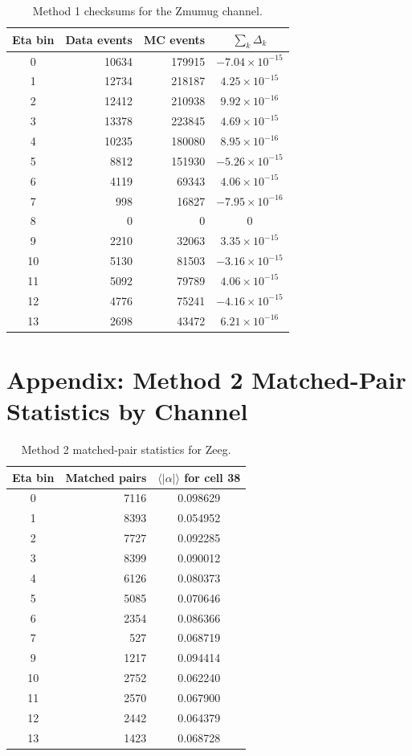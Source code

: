\documentclass[11pt,a4paper]{article}
\begin{document}
\begin{table}[H]
\centering
\caption{Method 1 checksums for the Zmumug channel.}
\begin{tabular}{crrc}
\toprule
Eta bin & Data events & MC events & $\sum_k \Delta_k$ \\
\midrule
0 & 10634 & 179915 & $-7.04 \times 10^{-15}$ \\
1 & 12734 & 218187 & $4.25 \times 10^{-15}$ \\
2 & 12412 & 210938 & $9.92 \times 10^{-16}$ \\
3 & 13378 & 223845 & $4.69 \times 10^{-15}$ \\
4 & 10235 & 180080 & $8.95 \times 10^{-16}$ \\
5 & 8812 & 151930 & $-5.26 \times 10^{-15}$ \\
6 & 4119 & 69343 & $4.06 \times 10^{-15}$ \\
7 & 998 & 16827 & $-7.95 \times 10^{-16}$ \\
8 & 0 & 0 & 0 \\
9 & 2210 & 32063 & $3.35 \times 10^{-15}$ \\
10 & 5130 & 81503 & $-3.16 \times 10^{-15}$ \\
11 & 5092 & 79789 & $4.06 \times 10^{-15}$ \\
12 & 4776 & 75241 & $-4.16 \times 10^{-15}$ \\
13 & 2698 & 43472 & $6.21 \times 10^{-16}$ \\
\bottomrule
\end{tabular}
\end{table}

\section{Appendix: Method 2 Matched-Pair Statistics by Channel}

\begin{table}[H]
\centering
\caption{Method 2 matched-pair statistics for Zeeg.}
\begin{tabular}{crc}
\toprule
Eta bin & Matched pairs & $\langle |\alpha| \rangle$ for cell 38 \\
\midrule
0 & 7116 & 0.098629 \\
1 & 8393 & 0.054952 \\
2 & 7727 & 0.092285 \\
3 & 8399 & 0.090012 \\
4 & 6126 & 0.080373 \\
5 & 5085 & 0.070646 \\
6 & 2354 & 0.086366 \\
7 & 527 & 0.068719 \\
9 & 1217 & 0.094414 \\
10 & 2752 & 0.062240 \\
11 & 2570 & 0.067900 \\
12 & 2442 & 0.064379 \\
13 & 1423 & 0.068728 \\
\bottomrule
\end{tabular}
\end{table}
\end{document}
